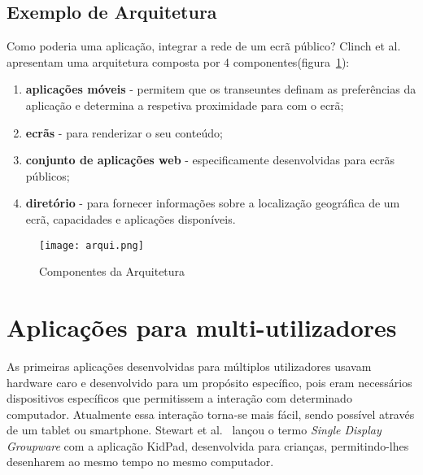 \subsection{Exemplo de Arquitetura}

Como poderia uma aplicação, integrar a rede de um ecrã público? Clinch et al.~\cite{Clinch2012}  apresentam uma arquitetura composta por 4 componentes(figura~\ref{fig:arquitetura}):

\begin{enumerate}
\item \textbf{aplicações móveis} - permitem que os transeuntes definam as preferências da aplicação e determina a respetiva proximidade para com o ecrã;
\item \textbf{ecrãs} - para renderizar o seu conteúdo;
\item \textbf{conjunto de aplicações web} - especificamente desenvolvidas para ecrãs públicos;
\item \textbf{diretório} - para fornecer informações sobre a localização geográfica de um ecrã, 
capacidades e aplicações disponíveis.
\end{enumerate}

\begin{figure}[ht]
\centering
\texttt{[image: arqui.png]}
\caption[Componentes da Arquitetura] {Componentes da Arquitetura~\cite{Gehring}}
\label{fig:arquitetura}
\end{figure}


\section{Aplicações para multi-utilizadores}

As primeiras aplicações desenvolvidas para múltiplos utilizadores usavam hardware caro e desenvolvido para um propósito específico, pois eram necessários dispositivos específicos que permitissem a interação com determinado computador. Atualmente essa interação torna-se mais fácil, sendo possível através de um tablet ou smartphone.
Stewart et al.~\cite{stewart1997single} lançou o termo \textit{Single Display Groupware} com a aplicação KidPad, desenvolvida para crianças, permitindo-lhes desenharem ao mesmo tempo no mesmo computador.

